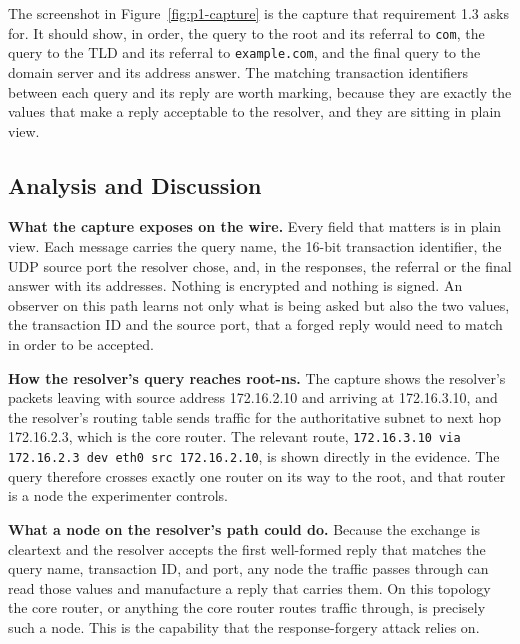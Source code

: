 \documentclass[11pt]{article}
\begin{document}

The screenshot in Figure~\ref{fig:p1-capture} is the capture that requirement 1.3
asks for. It should show, in order, the query to the root and its referral to
\texttt{com}, the query to the TLD and its referral to \texttt{example.com}, and
the final query to the domain server and its address answer. The matching
transaction identifiers between each query and its reply are worth marking,
because they are exactly the values that make a reply acceptable to the resolver,
and they are sitting in plain view.

\subsection{Analysis and Discussion}

\textbf{What the capture exposes on the wire.} Every field that matters is in
plain view. Each message carries the query name, the 16-bit transaction
identifier, the UDP source port the resolver chose, and, in the responses, the
referral or the final answer with its addresses. Nothing is encrypted and nothing
is signed. An observer on this path learns not only what is being asked but also
the two values, the transaction ID and the source port, that a forged reply would
need to match in order to be accepted.

\textbf{How the resolver's query reaches root-ns.} The capture shows the
resolver's packets leaving with source address 172.16.2.10 and arriving at
172.16.3.10, and the resolver's routing table sends traffic for the authoritative
subnet to next hop 172.16.2.3, which is the core router. The relevant route,
\texttt{172.16.3.10 via 172.16.2.3 dev eth0 src 172.16.2.10}, is shown directly in
the evidence. The query therefore crosses exactly one router on its way to the
root, and that router is a node the experimenter controls.

\textbf{What a node on the resolver's path could do.} Because the exchange is
cleartext and the resolver accepts the first well-formed reply that matches the
query name, transaction ID, and port, any node the traffic passes through can read
those values and manufacture a reply that carries them. On this topology the core
router, or anything the core router routes traffic through, is precisely such a
node. This is the capability that the response-forgery attack relies on.
\end{document}
